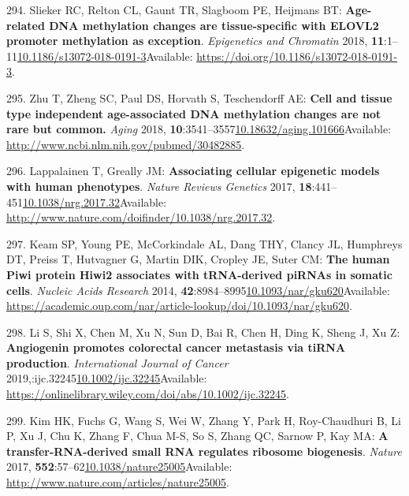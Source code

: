 \documentclass[
]{book}
\begin{document}
\leavevmode\hypertarget{ref-Slieker2018}{}%
294. Slieker RC, Relton CL, Gaunt TR, Slagboom PE, Heijmans BT: \textbf{Age-related DNA methylation changes are tissue-specific with ELOVL2 promoter methylation as exception}. \emph{Epigenetics and Chromatin} 2018, \textbf{11}:1--11\href{https://doi.org/10.1186/s13072-018-0191-3}{10.1186/s13072-018-0191-3}Available: \url{https://doi.org/10.1186/s13072-018-0191-3}.

\leavevmode\hypertarget{ref-Zhu2018}{}%
295. Zhu T, Zheng SC, Paul DS, Horvath S, Teschendorff AE: \textbf{Cell and tissue type independent age-associated DNA methylation changes are not rare but common.} \emph{Aging} 2018, \textbf{10}:3541--3557\href{https://doi.org/10.18632/aging.101666}{10.18632/aging.101666}Available: \url{http://www.ncbi.nlm.nih.gov/pubmed/30482885}.

\leavevmode\hypertarget{ref-Lappalainen2017}{}%
296. Lappalainen T, Greally JM: \textbf{Associating cellular epigenetic models with human phenotypes}. \emph{Nature Reviews Genetics} 2017, \textbf{18}:441--451\href{https://doi.org/10.1038/nrg.2017.32}{10.1038/nrg.2017.32}Available: \url{http://www.nature.com/doifinder/10.1038/nrg.2017.32}.

\leavevmode\hypertarget{ref-Keam2014}{}%
297. Keam SP, Young PE, McCorkindale AL, Dang THY, Clancy JL, Humphreys DT, Preiss T, Hutvagner G, Martin DIK, Cropley JE, Suter CM: \textbf{The human Piwi protein Hiwi2 associates with tRNA-derived piRNAs in somatic cells}. \emph{Nucleic Acids Research} 2014, \textbf{42}:8984--8995\href{https://doi.org/10.1093/nar/gku620}{10.1093/nar/gku620}Available: \url{https://academic.oup.com/nar/article-lookup/doi/10.1093/nar/gku620}.

\leavevmode\hypertarget{ref-Li2019}{}%
298. Li S, Shi X, Chen M, Xu N, Sun D, Bai R, Chen H, Ding K, Sheng J, Xu Z: \textbf{Angiogenin promotes colorectal cancer metastasis via tiRNA production}. \emph{International Journal of Cancer} 2019,:ijc.32245\href{https://doi.org/10.1002/ijc.32245}{10.1002/ijc.32245}Available: \url{https://onlinelibrary.wiley.com/doi/abs/10.1002/ijc.32245}.

\leavevmode\hypertarget{ref-Kim2017}{}%
299. Kim HK, Fuchs G, Wang S, Wei W, Zhang Y, Park H, Roy-Chaudhuri B, Li P, Xu J, Chu K, Zhang F, Chua M-S, So S, Zhang QC, Sarnow P, Kay MA: \textbf{A transfer-RNA-derived small RNA regulates ribosome biogenesis}. \emph{Nature} 2017, \textbf{552}:57--62\href{https://doi.org/10.1038/nature25005}{10.1038/nature25005}Available: \url{http://www.nature.com/articles/nature25005}.
\end{document}
